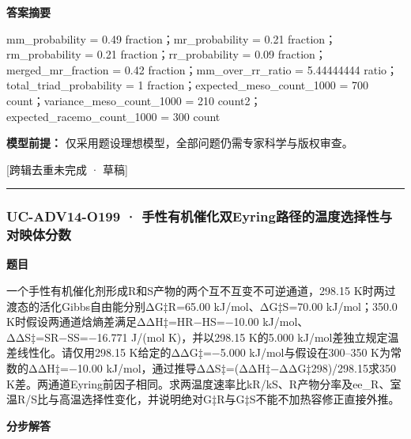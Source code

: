\documentclass[UTF8,11pt,a4paper]{ctexart}
\begin{document}
\noindent\textbf{答案摘要}\par
mm\_probability = 0.49 fraction；mr\_probability = 0.21 fraction；rm\_probability = 0.21 fraction；rr\_probability = 0.09 fraction；merged\_mr\_fraction = 0.42 fraction；mm\_over\_rr\_ratio = 5.44444444 ratio；total\_triad\_probability = 1 fraction；expected\_meso\_count\_1000 = 700 count；variance\_meso\_count\_1000 = 210 count2；expected\_racemo\_count\_1000 = 300 count\par
\noindent\textbf{模型前提：}
仅采用题设理想模型，全部问题仍需专家科学与版权审查。\par
\noindent\textcolor{red!65!black}{[跨辑去重未完成 · 草稿]} \par
\medskip\hrule\medskip
{}
\subsubsection*{UC-ADV14-O199 · 手性有机催化双Eyring路径的温度选择性与对映体分数}
\noindent\textbf{题目}\par
一个手性有机催化剂形成R和S产物的两个互不互变不可逆通道，298.15 K时两过渡态的活化Gibbs自由能分别ΔG‡R=65.00 kJ/mol、ΔG‡S=70.00 kJ/mol；350.0 K时假设两通道焓熵差满足ΔΔH‡=HR−HS=−10.00 kJ/mol、ΔΔS‡=SR−SS=−16.771 J/(mol K)，并以298.15 K的5.000 kJ/mol差独立规定温差线性化。请仅用298.15 K给定的ΔΔG‡=−5.000 kJ/mol与假设在300–350 K为常数的ΔΔH‡=−10.00 kJ/mol，通过推导ΔΔS‡=(ΔΔH‡−ΔΔG‡298)/298.15求350 K差。两通道Eyring前因子相同。求两温度速率比kR/kS、R产物分率及ee\_R、室温R/S比与高温选择性变化，并说明绝对G‡R与G‡S不能不加热容修正直接外推。\par
\medskip\noindent\textbf{分步解答}
\end{document}
